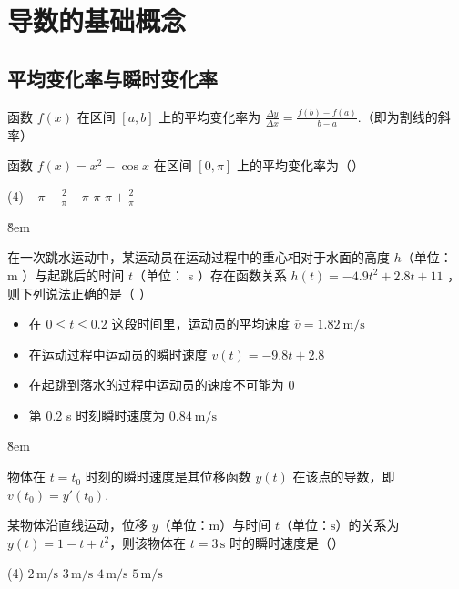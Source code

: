 \section{导数的基础概念}

\subsection{平均变化率与瞬时变化率}

\begin{theorem}[平均变化率]
    函数 $f(x)$ 在区间 $[a, b]$ 上的平均变化率为 $\frac{\Delta y}{\Delta x} = \frac{f(b) - f(a)}{b - a}$.（即为割线的斜率）
\end{theorem}
\begin{example}
    函数 $f(x) = x^{2} - \cos x$ 在区间 $\left[ 0, \pi \right]$ 上的平均变化率为（\quad）
    \begin{tasks}(4)
        \task $- \pi - \frac{2}{\pi}$
        \task $- \pi$
        \task $\pi$
        \task $\pi + \frac{2}{\pi}$
    \end{tasks}
\end{example}

\v{8em}

\begin{example}
    在一次跳水运动中，某运动员在运动过程中的重心相对于水面的高度 $h$（单位： m ）与起跳后的时间 $t$（单位： s ）存在函数关系 $h(t)=-4.9 t^2+2.8 t+11$ ，则下列说法正确的是（ \quad）
    \begin{itemize}
        \item 在 $0 \leq t \leq 0.2$ 这段时间里，运动员的平均速度 $\bar{v}=1.82 \mathrm{~m} / \mathrm{s}$
        \item 在运动过程中运动员的瞬时速度 $v(t)=-9.8 t+2.8$
        \item 在起跳到落水的过程中运动员的速度不可能为 0
        \item 第 0.2 s 时刻瞬时速度为 $0.84 \mathrm{~m} / \mathrm{s}$
    \end{itemize}
\end{example}

\v{8em}

\begin{theorem}[瞬时速度的物理意义]
    物体在 $t=t_0$ 时刻的瞬时速度是其位移函数 $y(t)$ 在该点的导数，即 $v(t_0) = y'(t_0)$.
\end{theorem}

\begin{example}
    某物体沿直线运动，位移 $y$（单位：$\mathrm{m}$）与时间 $t$（单位：$\mathrm{s}$）的关系为 $y(t) = 1 - t + t^{2}$，则该物体在 $t = 3\,\mathrm{s}$ 时的瞬时速度是（\quad）
    \begin{tasks}(4)
        \task $2\,\mathrm{m/s}$
        \task $3\,\mathrm{m/s}$
        \task $4\,\mathrm{m/s}$
        \task $5\,\mathrm{m/s}$
    \end{tasks}
\end{example}

